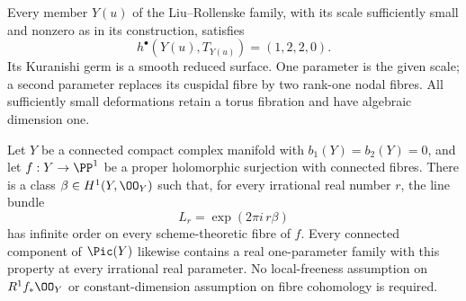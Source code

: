 \begin{proposition}\hypertarget{tag-01GL}{}\label{cdp:st:E14}


Every member $Y(u)$ of the Liu--Rollenske family, with its scale
sufficiently small and nonzero as in its construction, satisfies
\[
 h^\bullet(Y(u),T_{Y(u)})=(1,2,2,0).
\]
Its Kuranishi germ is a smooth reduced surface. One parameter is
the given scale; a second parameter replaces its cuspidal fibre by
two rank-one nodal fibres. All sufficiently small deformations
retain a torus fibration and have algebraic dimension one.
\end{proposition}

\begin{proposition}\hypertarget{tag-01G7}{}\label{cdp:st:D.1.9}


Let $Y$ be a connected compact complex manifold with
$b_1(Y)=b_2(Y)=0$, and let $f:Y\to\PP^1$ be a proper
holomorphic surjection with connected fibres. There is a class
$\beta\in H^1(Y,\OO_Y)$ such that, for every irrational real number
$r$, the line bundle
\[
L_r=\exp(2\pi i\,r\beta)
\]
has infinite order on every scheme-theoretic fibre of $f$.
Every connected component of $\Pic(Y)$ likewise contains a real
one-parameter family with this property at every irrational real
parameter.
No local-freeness assumption on $R^1f_*\OO_Y$ or constant-dimension
assumption on fibre cohomology is required.
\end{proposition}

